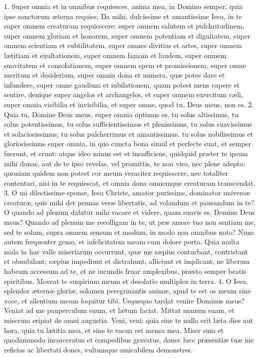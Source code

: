 1. Super omnia et in omnibus requiesces, anima mea, in Domino semper, quia ipse sanctorum æterna requies. Da mihi, dulcissime et amantissime Iesu, in te super omnem creaturam requiescere: super omnem salutem et pulchritudinem, super omnem gloriam et honorem, super omnem potentiam et dignitatem, super omnem scientiam et subtilitatem, super omnes divitias et artes, super omnem lætitiam et exultationem, super omnem famam et laudem, super omnem suavitatem et consolationem, super omnem spem et promissionem, super omne meritum et desiderium, super omnia dona et munera, quæ potes dare et infundere, super omne gaudium et iubilationem, quam potest mens capere et sentire, denique super angelos et archangelos, et super omnem exercitum cæli, super omnia visibilia et invisibilia, et super omne, quod tu, Deus meus, non es.
2. Quia tu, Domine Deus meus, super omnia optimus es, tu solus altissimus, tu solus potentissimus, tu solus sufficientissimus et plenissimus, tu solus suavissimus et solaciosissimus, tu solus pulcherrimus et amantissimus, tu solus nobilissimus et gloriosissimus super omnia, in quo cuncta bona simul et perfecte sunt, et semper fuerunt, et erunt: atque ideo minus est et insufficiens, quidquid præter te ipsum mihi donas, aut de te ipso revelas, vel promittis, te non viso, nec plene adepto: quoniam quidem non potest cor meum veraciter requiescere, nec totaliter contentari, nisi in te requiescat, et omnia dona omnemque creaturam transcendat.
3. O mi dilectissime sponse, Iesu Christe, amator purissime, dominator universæ creaturæ, quis mihi det pennas veræ libertatis, ad volandum et pausandum in te? O quando ad plenum dabitur mihi vacare et videre, quam suavis es, Domine Deus meus? Quando ad plenum me recolligam in te, ut præ amore tuo non sentiam me, sed te solum, supra omnem sensum et modum, in modo non omnibus noto? Nunc autem frequenter gemo, et infelicitatem meam cum dolore porto. Quia multa mala in hac valle miseriarum occurrunt, quæ me sæpius conturbant, contristant et obnubilant; sæpius impediunt et distrahunt, alliciunt et implicant, ne liberum habeam accessum ad te, et ne iucundis fruar amplexibus, præsto semper beatis spiritibus. Moveat te suspirium meum et desolatio multiplex in terra.
4. O Iesu, splendor æternæ gloriæ, solamen peregrinantis animæ, apud te est os meum sine voce, et silentium meum loquitur tibi. Usquequo tardat venire Dominus meus? Veniat ad me pauperculum suum, et lætum faciat. Mittat manum suam, et miserum eripiat de omni angustia. Veni, veni: quia sine te nulla erit læta dies aut hora, quia tu lætitia mea, et sine te vacua est mensa mea. Miser sum et quodammodo incarceratus et compedibus gravatus, donec luce præsentiæ tuæ me reficias ac libertati dones, vultumque amicabilem demonstres.
